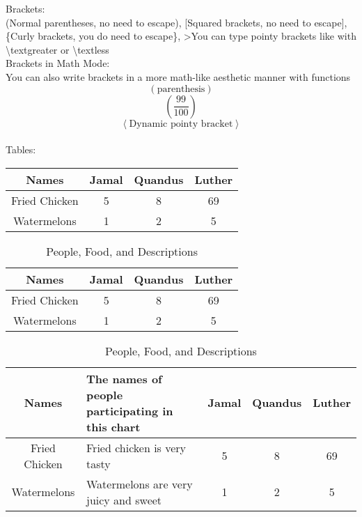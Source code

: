 \documentclass[12pt]{article}
\begin{document}
Brackets: \\[5pt]
(Normal parentheses, no need to escape), [Squared brackets, no need to escape], \{Curly brackets, you do need to escape\}, \textgreater You can type pointy brackets like with \textbackslash textgreater or \textbackslash textless \\[5pt]

Brackets in Math Mode: \\[5pt]
You can also write brackets in a more math-like aesthetic manner with functions \\[5pt]
$${ \left( \text{parenthesis} \right)}$$
$${ \left( \frac{99}{100} \right)}$$
$${ \left< \text{Dynamic pointy bracket} \right> }$$ \\[5pt]

Tables: \\[5pt]
\begin{center}
    \begin{tabular}{|c||c|c|c|}
        \hline
        Names & Jamal & Quandus & Luther \\ \hline
        Fried Chicken & 5 & 8 & 69 \\ \hline
        Watermelons & 1 & 2 & 5 \\ \hline
    \end{tabular} \vspace{20pt}
\end{center} \vspace{10pt}

\begin{table}[H]
    \centering
    \def\arraystretch{1.5} %

    \begin{tabular}{|c||c|c|c|}
        \hline
        Names & Jamal & Quandus & Luther \\ \hline
        Fried Chicken & 5 & 8 & 69 \\ \hline
        Watermelons & 1 & 2 & 5 \\ \hline
    \end{tabular}
    \caption{People and Food}
    \vspace{20pt}

    \begin{tabular}{|c||p{1in}|c|c|c|}
        \hline
        Names & The names of people participating in this chart & Jamal & Quandus & Luther \\ \hline
        Fried Chicken & Fried chicken is very tasty & 5 & 8 & 69 \\ \hline
        Watermelons & Watermelons are very juicy and sweet & 1 & 2 & 5 \\ \hline
    \end{tabular} 
    \caption{People, Food, and Descriptions}
    \vspace{20pt}
\end{table} \vspace{10pt}
\end{document}
